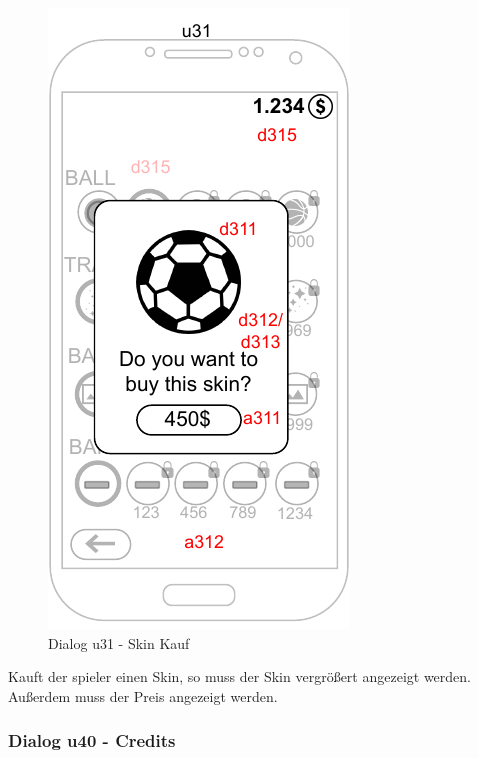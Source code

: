 \begin{figure}
    \begin{center}
    \includegraphics{diagramme/pdf/Mockup-u31.pdf}
\end{center}
    \caption{Dialog u31 - Skin Kauf}
\end{figure}

Kauft der \gls{spieler} einen Skin, so muss der Skin vergrößert angezeigt werden. Außerdem muss der Preis angezeigt werden.
\clearpage

\subsubsection{Dialog u40 - Credits}

